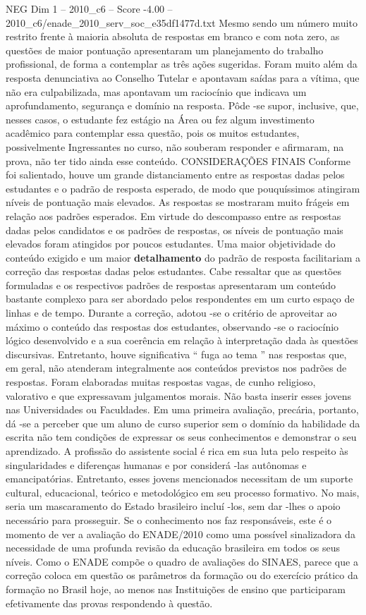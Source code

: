 \begin{textsample}{NEG Dim 1 – 2010\_c6 – Score -4.00 – 2010\_c6/enade\_2010\_serv\_soc\_e35df1477d.txt}
Mesmo sendo um número muito restrito frente à maioria absoluta de respostas em branco e com nota zero, as questões de maior pontuação apresentaram um planejamento do trabalho profissional, de forma a contemplar as três ações sugeridas.
Foram muito além da resposta denunciativa ao Conselho Tutelar e apontavam saídas para a vítima, que não era culpabilizada, mas apontavam um raciocínio que indicava um aprofundamento, segurança e domínio na resposta.
Pôde -se supor, inclusive, que, nesses casos, o estudante fez estágio na Área ou fez algum investimento acadêmico para contemplar essa questão, pois os muitos estudantes, possivelmente Ingressantes no curso, não souberam responder e afirmaram, na prova, não ter tido ainda esse conteúdo.
CONSIDERAÇÕES FINAIS Conforme foi salientado, houve um grande distanciamento entre as respostas dadas pelos estudantes e o padrão de resposta esperado, de modo que pouquíssimos atingiram níveis de pontuação mais elevados.
As respostas se mostraram muito frágeis em relação aos padrões esperados.
Em virtude do descompasso entre as respostas dadas pelos candidatos e os padrões de respostas, os níveis de pontuação mais elevados foram atingidos por poucos estudantes.
Uma maior objetividade do conteúdo exigido e um maior \textbf{detalhamento} do padrão de resposta facilitariam a correção das respostas dadas pelos estudantes.
Cabe ressaltar que as questões formuladas e os respectivos padrões de respostas apresentaram um conteúdo bastante complexo para ser abordado pelos respondentes em um curto espaço de linhas e de tempo.
Durante a correção, adotou -se o critério de aproveitar ao máximo o conteúdo das respostas dos estudantes, observando -se o raciocínio lógico desenvolvido e a sua coerência em relação à interpretação dada às questões discursivas.
Entretanto, houve significativa “ fuga ao tema ” nas respostas que, em geral, não atenderam integralmente aos conteúdos previstos nos padrões de respostas.
Foram elaboradas muitas respostas vagas, de cunho religioso, valorativo e que expressavam julgamentos morais.
Não basta inserir esses jovens nas Universidades ou Faculdades.
Em uma primeira avaliação, precária, portanto, dá -se a perceber que um aluno de curso superior sem o domínio da habilidade da escrita não tem condições de expressar os seus conhecimentos e demonstrar o seu aprendizado.
A profissão do assistente social é rica em sua luta pelo respeito às singularidades e diferenças humanas e por considerá -las autônomas e emancipatórias.
Entretanto, esses jovens mencionados necessitam de um suporte cultural, educacional, teórico e metodológico em seu processo formativo.
No mais, seria um mascaramento do Estado brasileiro incluí -los, sem dar -lhes o apoio necessário para prosseguir.
Se o conhecimento nos faz responsáveis, este é o momento de ver a avaliação do ENADE/2010 como uma possível sinalizadora da necessidade de uma profunda revisão da educação brasileira em todos os seus níveis.
Como o ENADE compõe o quadro de avaliações do SINAES, parece que a correção coloca em questão os parâmetros da formação ou do exercício prático da formação no Brasil hoje, ao menos nas Instituições de ensino que participaram efetivamente das provas respondendo à questão.


\end{textsample}
